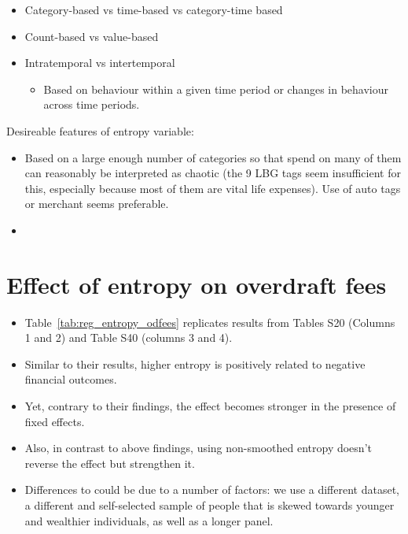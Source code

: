 \begin{itemize}
    \item Category-based vs time-based vs category-time based
        \citep{guidotti2015behavioral, krumme2013predictability}

    \item Count-based vs value-based

    \item Intratemporal vs intertemporal \citep{krumme2013predictability}

        \begin{itemize}
            \item Based on behaviour within a given time period or changes in
                behaviour across time periods.
        \end{itemize}
        
\end{itemize}

Desireable features of entropy variable:

\begin{itemize}
    \item Based on a large enough number of categories so that spend on many of
        them can reasonably be interpreted as chaotic (the 9 LBG tags seem
        insufficient for this, especially because most of them are vital life
        expenses). Use of auto tags or merchant seems preferable.

    \item 
\end{itemize}


\section{Effect of entropy on overdraft fees}%
\label{sub:effect_of_entropy_on_overdraft_fees}

\begin{itemize}

    \item Table~\ref{tab:reg_entropy_odfees} replicates results from
        \citet{muggleton2020evidence} Tables S20 (Columns 1 and 2) and Table
        S40 (columns 3 and 4).

    \item Similar to their results, higher entropy is positively related to
        negative financial outcomes.

    \item Yet, contrary to their findings, the effect becomes stronger in the
        presence of fixed effects.

    \item Also, in contrast to above findings, using non-smoothed entropy
        doesn't reverse the effect but strengthen it.

    \item Differences to \citet{muggleton2020evidence} could be due to a number
        of factors: we use a different dataset, a different and self-selected sample of people
        that is skewed towards younger and wealthier individuals, as well as a
        longer panel.

\end{itemize}






